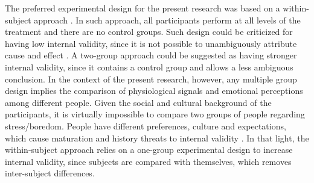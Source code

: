 The preferred experimental design for the present research was based on a within-subject approach \parencite{lane2015online}. In such approach, all participants perform at all levels of the treatment and there are no control groups.
Such design could be criticized for having low internal validity, since it is not possible to unambiguously attribute cause and effect \parencite{kirk1982experimental}. A two-group approach could be suggested as having stronger internal validity, since it contains a control group and allows a less ambiguous conclusion. In the context of the present research, however, any multiple group design implies the comparison of physiological signals and emotional perceptions among different people. Given the social and cultural background of the participants, it is virtually impossible to compare two groups of people regarding stress/boredom. People have different preferences, culture and expectations, which cause maturation and history threats to internal validity \parencite{trochim2001research}.
In that light, the within-subject approach relies on a one-group experimental design to increase internal validity, since subjects are compared with themselves, which removes inter-subject differences.

